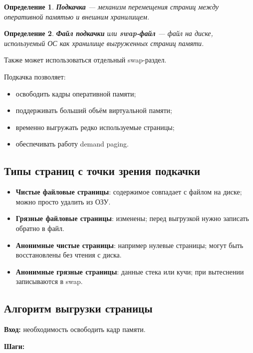 \documentclass[a4paper,12pt]{article}
\newtheorem{definition}{Определение}
\begin{document}
\begin{definition}
\textbf{Подкачка} --- механизм перемещения страниц между оперативной памятью и внешним хранилищем.
\end{definition}

\begin{definition}
\textbf{Файл подкачки} или \textbf{swap-файл} --- файл на диске, используемый ОС как хранилище выгруженных страниц памяти.
\end{definition}

Также может использоваться отдельный swap-раздел.

Подкачка позволяет:

\begin{itemize}
    \item освободить кадры оперативной памяти;
    \item поддерживать больший объём виртуальной памяти;
    \item временно выгружать редко используемые страницы;
    \item обеспечивать работу demand paging.
\end{itemize}

\subsection{Типы страниц с точки зрения подкачки}

\begin{itemize}
    \item \textbf{Чистые файловые страницы}: содержимое совпадает с файлом на диске; можно просто удалить из ОЗУ.
    \item \textbf{Грязные файловые страницы}: изменены; перед выгрузкой нужно записать обратно в файл.
    \item \textbf{Анонимные чистые страницы}: например нулевые страницы; могут быть восстановлены без чтения с диска.
    \item \textbf{Анонимные грязные страницы}: данные стека или кучи; при вытеснении записываются в swap.
\end{itemize}

\subsection{Алгоритм выгрузки страницы}

\textbf{Вход:} необходимость освободить кадр памяти.

\textbf{Шаги:}
\end{document}
